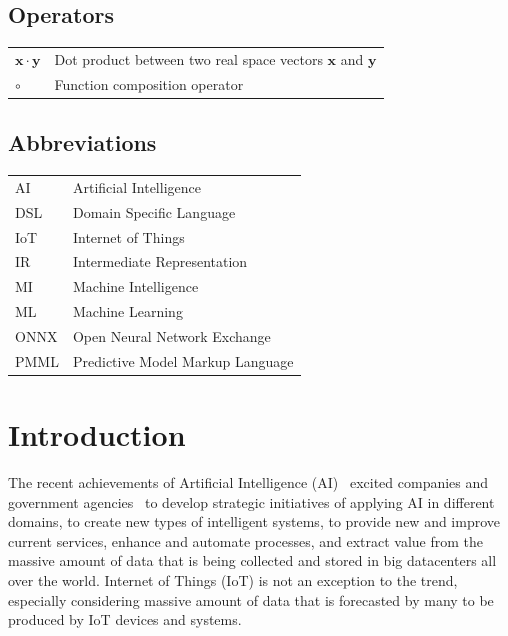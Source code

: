 \documentclass[english, 12pt, a4paper, elec, utf8, online]{aaltothesis}
\begin{document}
\subsection*{Operators}

\begin{tabular}{ll}
$\mathbf{x} \cdot \mathbf{y}$              & Dot product between two real space vectors $\mathbf{x}$ and $\mathbf{y}$\\
$\circ$ & Function composition operator  
\end{tabular}

\subsection*{Abbreviations}

\begin{tabular}{ll}
AI         & Artificial Intelligence \\   
DSL        & Domain Specific Language \\
IoT        & Internet of Things \\
IR         & Intermediate Representation \\ 
MI         & Machine Intelligence \\
ML         & Machine Learning \\
ONNX       & Open Neural Network Exchange \\
PMML       & Predictive Model Markup Language\\
\end{tabular}


\cleardoublepage

\section{Introduction}
\thispagestyle{empty}
The recent achievements of Artificial Intelligence (AI)~\cite{tan_lim_2018}  excited companies and government agencies~\cite{temreport2017} to develop strategic initiatives of applying AI in different domains, to create new types of intelligent systems, to provide new and improve current services, enhance and automate processes, and extract value from the massive amount of data that is being collected and stored in big datacenters all over the world. Internet of Things (IoT) is not an exception to the trend, especially considering massive amount of data that is forecasted by many to be produced by IoT devices and systems.
\end{document}
